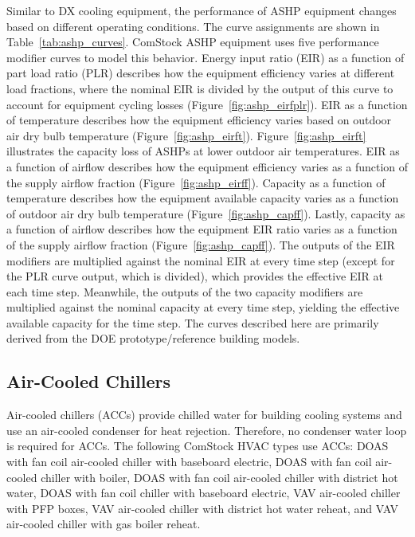 Similar to DX cooling equipment, the performance of ASHP equipment changes based on different operating conditions. The curve assignments are shown in Table~\ref{tab:ashp_curves}. ComStock ASHP equipment uses five performance modifier curves to model this behavior. Energy input ratio (EIR) as a function of part load ratio (PLR) describes how the equipment efficiency varies at different load fractions, where the nominal EIR is divided by the output of this curve to account for equipment cycling losses (Figure~\ref{fig:ashp_eirfplr}). EIR as a function of temperature describes how the equipment efficiency varies based on outdoor air dry bulb temperature (Figure~\ref{fig:ashp_eirft}). Figure~\ref{fig:ashp_eirft} illustrates the capacity loss of ASHPs at lower outdoor air temperatures. EIR as a function of airflow describes how the equipment efficiency varies as a function of the supply airflow fraction (Figure~\ref{fig:ashp_eirff}). Capacity as a function of temperature describes how the equipment available capacity varies as a function of outdoor air dry bulb temperature (Figure~\ref{fig:ashp_capff}). Lastly, capacity as a function of airflow describes how the equipment EIR ratio varies as a function of the supply airflow fraction (Figure~\ref{fig:ashp_capff}). The outputs of the EIR modifiers are multiplied against the nominal EIR at every time step (except for the PLR curve output, which is divided), which provides the effective EIR at each time step. Meanwhile, the outputs of the two capacity modifiers are multiplied against the nominal capacity at every time step, yielding the effective available capacity for the time step. The curves described here are primarily derived from the DOE prototype/reference building models.


\subsection{Air-Cooled Chillers}

Air-cooled chillers (ACCs) provide chilled water for building cooling systems and use an air-cooled condenser for heat rejection. Therefore, no condenser water loop is required for ACCs. The following ComStock HVAC types use ACCs: DOAS with fan coil air-cooled chiller with baseboard electric, DOAS with fan coil air-cooled chiller with boiler, DOAS with fan coil air-cooled chiller with district hot water, DOAS with fan coil chiller with baseboard electric, VAV air-cooled chiller with PFP boxes, VAV air-cooled chiller with district hot water reheat, and VAV air-cooled chiller with gas boiler reheat.

